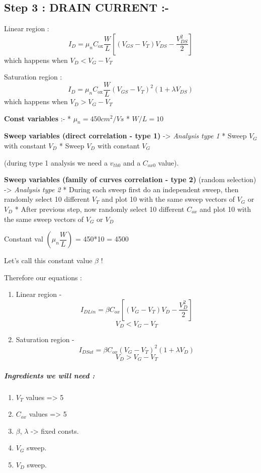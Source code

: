 \documentclass[11pt]{article}
\providecommand{\tightlist}{%
      \setlength{\itemsep}{0pt}\setlength{\parskip}{0pt}}
\begin{document}
    \hypertarget{step-3-drain-current--}{%
\subsection{Step 3 : DRAIN CURRENT :-}\label{step-3-drain-current--}}

Linear region :
\[I_D = \mu_n C_{\text{ox}} \dfrac{W}{L} \left[(V_{GS}-V_T) V_{DS} - \dfrac{V_{DS}^2}{2}\right]\]
which happens when \(V_D < V_G - V_T\)

Saturation region :
\[I_D = \mu_n C_{\text{ox}} \dfrac{W}{L} \left( V_{GS}-V_T \right)^2 \left( 1 + \lambda V_{DS} \right)\]
which happens when \(V_D > V_G - V_T\)

    \textbf{Const variables} :- * \(\mu_n = 450 cm^2/Vs\) * \(W/L = 10\)

\textbf{Sweep variables (direct correlation - type 1)} -\textgreater{}
\emph{Analysis type 1} * Sweep \(V_G\) with constant \(V_D\) * Sweep
\(V_D\) with constant \(V_G\)

(during type 1 analysis we need a \(v_{th0}\) and a \(C_{ox0}\) value).

\textbf{Sweep variables (family of curves correlation - type 2)} (random
selection) -\textgreater{} \emph{Analysis type 2} * During each sweep
first do an independent sweep, then randomly select 10 different \(V_T\)
and plot 10 with the same sweep vectors of \(V_G\) or \(V_D\) * After
previous step, now randomly select 10 different \(C_{ox}\) and plot 10
with the same sweep vectors of \(V_G\) or \(V_D\)

    Constant val \(\left( \mu_n \dfrac{W}{L} \right)\) = 450*10 = 4500

Let's call this constant value \(\beta\) !

Therefore our equations :

\begin{enumerate}
\def\labelenumi{\arabic{enumi}.}
\tightlist
\item
  Linear region -
  \[I_{DLin} = \beta C_{ox} \left[ (V_G - V_T)V_D - \dfrac{V_D^2}{2} \right]\]\[V_D < V_G - V_T\]
\item
  Saturation region -
  \[I_{DSat} = \beta C_{ox} (V_G - V_T)^2 \left( 1 + \lambda V_D \right)\]\[V_D > V_G - V_T\]
\end{enumerate}

\hypertarget{ingredients-we-will-need}{%
\subparagraph{Ingredients we will need
:}\label{ingredients-we-will-need}}

\begin{enumerate}
\def\labelenumi{\arabic{enumi}.}
\tightlist
\item
  \(V_T\) values =\textgreater{} 5
\item
  \(C_{ox}\) values =\textgreater{} 5
\item
  \(\beta\), \(\lambda\) -\textgreater{} fixed consts.
\item
  \(V_G\) sweep.
\item
  \(V_D\) sweep.
\end{enumerate}
\end{document}
